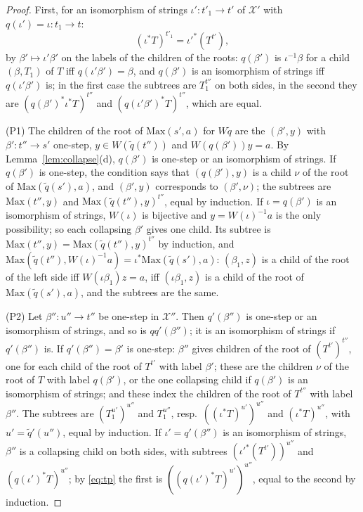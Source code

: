 \documentclass[11pt]{amsart}
\theoremstyle{definition}
\newcommand{\Max}{\mathrm{Max}}
\newcommand{\cX}{\mathcal X}
\begin{document}
\begin{proof}
First, for an isomorphism of strings $\iota'\colon t'_1\to t'$ of
$\cX'$ with $q(\iota')=\iota\colon t_1\to t$:
\begin{equation}\label{eq:tp}
(\iota^*T)^{t'_1}=\iota'^*(T^{t'}),
\end{equation}
by $\beta'\mapsto\iota'\beta'$ on the labels of the children of the
roots: $q(\beta')$ is $\iota^{-1}\beta$ for a child $(\beta,T_1)$ of
$T$ iff $q(\iota'\beta')=\beta$, and $q(\beta')$ is an isomorphism of
strings iff $q(\iota'\beta')$ is; in the first case the subtrees are
$T_1^{t''}$ on both sides, in the second they are $(q(\beta')^*
\iota^*T)^{t''}$ and $(q(\iota'\beta')^*T)^{t''}$, which are equal.

(P1) The children of the root of $\Max(s',a)$ for $W\tilde q$ are the
$(\beta',y)$ with $\beta'\colon t''\to s'$ one-step, $y\in W(\tilde
q(t''))$ and $W(q(\beta'))y=a$. By Lemma~\ref{lem:collapse}(d),
$q(\beta')$ is one-step or an isomorphism of strings. If $q(\beta')$
is one-step, the condition says that $(q(\beta'),y)$ is a child $\nu$
of the root of $\Max(\tilde q(s'),a)$, and $(\beta',y)$ corresponds to
$(\beta',\nu)$; the subtrees are $\Max(t'',y)$ and $\Max(\tilde
q(t''),y)^{t''}$, equal by induction. If $\iota=q(\beta')$ is an
isomorphism of strings, $W(\iota)$ is bijective and
$y=W(\iota)^{-1}a$ is the only possibility; so each collapsing
$\beta'$ gives one child. Its subtree is $\Max(t'',y)=\Max(\tilde
q(t''),y)^{t''}$ by induction, and $\Max(\tilde
q(t''),W(\iota)^{-1}a)=\iota^*\Max(\tilde q(s'),a)$: $(\beta_1,z)$ is
a child of the root of the left side iff $W(\iota\beta_1)z=a$, iff
$(\iota\beta_1,z)$ is a child of the root of $\Max(\tilde q(s'),a)$,
and the subtrees are the same.

(P2) Let $\beta''\colon u''\to t''$ be one-step in $\cX''$. Then
$q'(\beta'')$ is one-step or an isomorphism of strings, and so is
$qq'(\beta'')$; it is an isomorphism of strings if $q'(\beta'')$ is.
If $q'(\beta'')=\beta'$ is one-step: $\beta''$ gives children of the
root of $(T^{t'})^{t''}$, one for each child of the root of $T^{t'}$
with label $\beta'$; these are the children $\nu$ of the root of $T$
with label $q(\beta')$, or the one collapsing child if $q(\beta')$ is
an isomorphism of strings; and these index the children of the root of
$T^{t''}$ with label $\beta''$. The subtrees are $(T_1^{u'})^{u''}$
and $T_1^{u''}$, resp.\ $((\iota^*T)^{u'})^{u''}$ and
$(\iota^*T)^{u''}$, with $u'=\tilde q'(u'')$, equal by induction. If
$\iota'=q'(\beta'')$ is an isomorphism of strings, $\beta''$ is a
collapsing child on both sides, with subtrees
$(\iota'^*(T^{t'}))^{u''}$ and $(q(\iota')^*T)^{u''}$; by
\eqref{eq:tp} the first is $((q(\iota')^*T)^{u'})^{u''}$, equal to the
second by induction.


\end{proof}
\end{document}

